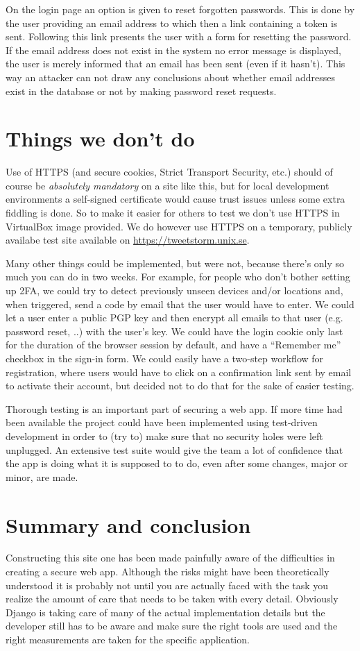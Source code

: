 \documentclass[11pt,english]{article}
\begin{document}
On the login page an option is given to reset forgotten passwords. This is done by the user providing an email address to which then a link containing a token is sent. Following this link presents the user with a form for resetting the password. If the email address does not exist in the system no error message is displayed, the user is merely informed that an email has been sent (even if it hasn’t). This way an attacker can not draw any conclusions about whether email addresses exist in the database or not by making password reset requests.

\section{Things we don't do}

Use of HTTPS (and secure cookies, Strict Transport Security, etc.) should of course be \emph{absolutely mandatory} on a site like this, but for local development environments a self-signed certificate would cause trust issues unless some extra fiddling is done. So to make it easier for others to test we don’t use HTTPS in VirtualBox image provided. We do however use HTTPS on a temporary, publicly availabe test site available on \url{https://tweetstorm.unix.se}.

Many other things could be implemented, but were not, because there’s only so much you can do in two weeks. For example, for people who don’t bother setting up 2FA, we could try to detect previously unseen devices and/or locations and, when triggered, send a code by email that the user would have to enter. We could let a user enter a public PGP key and then encrypt all emails to that user (e.g. password reset, ..) with the user’s key. We could have the login cookie only last for the duration of the browser session by default, and have a “Remember me” checkbox in the sign-in form. We could easily have a two-step workflow for registration, where users would have to click on a confirmation link sent by email to activate their account, but decided not to do that for the sake of easier testing.

Thorough testing is an important part of securing a web app. If more time had been available the project could have been implemented using test-driven development in order to (try to) make sure that no security holes were left unplugged. An extensive test suite would give the team a lot of confidence that the app is doing what it is supposed to to do, even after some changes, major or minor, are made.

\section{Summary and conclusion}

Constructing this site one has been made painfully aware of the difficulties in creating a secure web app. Although the risks might have been theoretically understood it is probably not until you are actually faced with the task you realize the amount of care that needs to be taken with every detail. Obviously Django is taking care of many of the actual implementation details but the developer still has to be aware and make sure the right tools are used and the right measurements are taken for the specific application.
\end{document}
